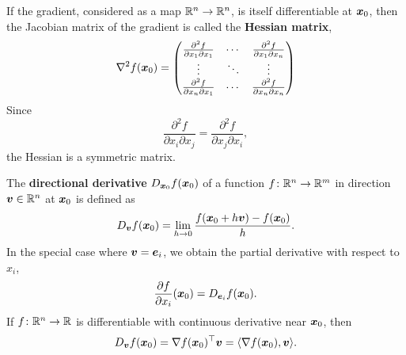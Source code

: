\documentclass[11pt,a4paper]{memoir}
\begin{document}
 If the gradient, considered as a map $\mathbb{R}^n\to \mathbb{R}^n$, is itself differentiable at $\bm{x}_0$, then the Jacobian matrix of the gradient is called the \textbf{Hessian matrix}, 
\begin{equation*}
 \nabla^2f(\bm{x}_0) = \begin{pmatrix}
                         \frac{\partial^2f}{\partial x_1\partial x_1} & \cdots & \frac{\partial^2f}{\partial x_1\partial x_n}\\
                         \vdots & \ddots & \vdots\\
                         \frac{\partial^2f}{\partial x_n\partial x_1} & \cdots & \frac{\partial^2f}{\partial x_n\partial x_n}
                        \end{pmatrix}
\end{equation*}
Since
\begin{equation*}
 \frac{\partial^2f}{\partial x_i\partial x_j} = \frac{\partial^2f}{\partial x_j\partial x_i}, 
\end{equation*}
the Hessian is a symmetric matrix.

The \textbf{directional derivative} $D_{\bm{x}_0}f(\bm{x}_0)$ of a function $f\colon \mathbb{R}^n\to \mathbb{R}^m$ in direction $\bm{v}\in \mathbb{R}^n$ at $\bm{x}_0$ is defined as
\begin{equation*}
 D_{\bm{v}}f(\bm{x}_0) = \lim_{h\to 0}\frac{f(\bm{x}_0+h\bm{v})-f(\bm{x}_0)}{h}.
\end{equation*}
In the special case where $\bm{v}=\bm{e}_i$, we obtain the partial derivative with respect to $x_i$,
\begin{equation*}
 \frac{\partial f}{\partial x_i}(\bm{x}_0) = D_{\bm{e}_i}f(\bm{x}_0).
\end{equation*}
If $f\colon \mathbb{R}^n\to \mathbb{R}$ is differentiable with continuous derivative near $\bm{x}_0$, then
\begin{equation*}
 D_{\bm{v}}f(\bm{x}_0) = \nabla f(\bm{x}_0)^{\top}\bm{v} = \langle {\nabla f(\bm{x}_0)}, {\bm{v}} \rangle.
\end{equation*}
\end{document}
